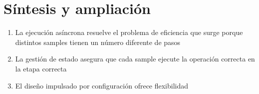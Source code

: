 \section{Síntesis y ampliación}
\begin{enumerate}
  \item La ejecución asíncrona resuelve el problema de eficiencia que surge porque distintos samples tienen un número diferente de pasos
  \item La gestión de estado asegura que cada sample ejecute la operación correcta en la etapa correcta
  \item El diseño impulsado por configuración ofrece flexibilidad
\end{enumerate}

